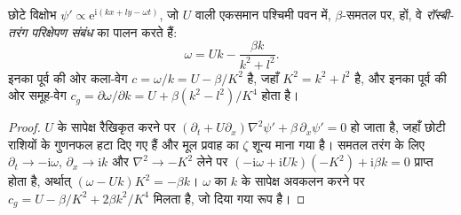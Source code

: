 \begin{theorem}[रॉस्बी तरंगों का परिक्षेपण]\label{thm:b3:atmospheric-dynamics:rossby}
छोटे विक्षोभ $\psi' \propto \mathrm e^{\mathrm i(kx + ly - \omega t)}$, जो
$U$ वाली एकसमान पश्चिमी पवन में, $\beta$-समतल पर, हों, वे
\emph{रॉस्बी-तरंग परिक्षेपण संबंध} का पालन करते हैं:
\[
\omega = Uk - \frac{\beta k}{k^2 + l^2} .
\]
इनका पूर्व की ओर कला-वेग $c = \omega/k = U - \beta/K^2$ है, जहाँ $K^2 =
k^2 + l^2$ है, और इनका पूर्व की ओर समूह-वेग $c_g = \partial\omega/\partial
k = U + \beta(k^2 - l^2)/K^4$ होता है।
\end{theorem}

\begin{proof}
$U$ के सापेक्ष रैखिकृत करने पर 
$(\partial_t + U\partial_x)\nabla^2\psi' + \beta\,\partial_x\psi' = 0$ हो जाता है, जहाँ
छोटी राशियों के गुणनफल हटा दिए गए हैं और मूल प्रवाह का $\zeta$
शून्य माना गया है। समतल तरंग के लिए $\partial_t \to -\mathrm i\omega$,
$\partial_x \to \mathrm ik$ और $\nabla^2 \to -K^2$ लेने पर $(-\mathrm i\omega +
\mathrm iUk)(-K^2) + \mathrm i\beta k = 0$ प्राप्त होता है, अर्थात् $(\omega - Uk)K^2 =
-\beta k$। $\omega$ का $k$ के सापेक्ष अवकलन करने पर $c_g = U -
\beta/K^2 + 2\beta k^2/K^4$ मिलता है, जो दिया गया रूप है।
\end{proof}

